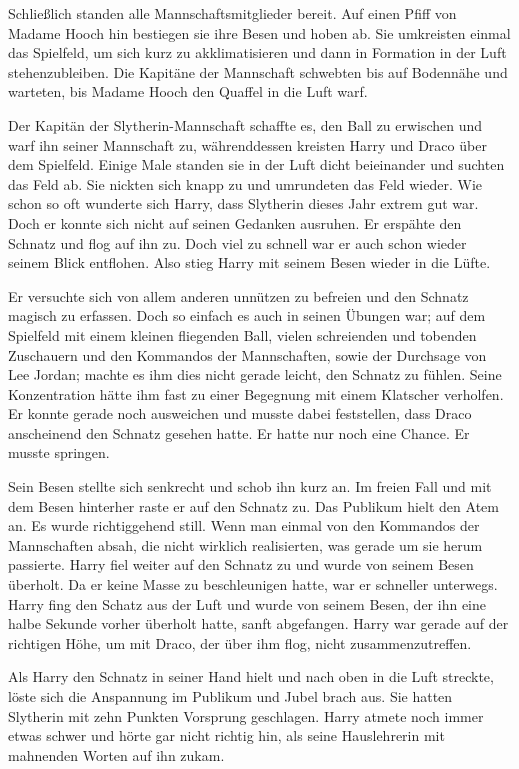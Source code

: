 Schließlich standen alle Mannschaftsmitglieder bereit. Auf einen Pfiff von Madame Hooch hin bestiegen sie ihre Besen und hoben ab. Sie umkreisten einmal das Spielfeld, um sich kurz zu akklimatisieren und dann in Formation in der Luft stehenzubleiben. Die Kapitäne der Mannschaft schwebten bis auf Bodennähe und warteten, bis Madame Hooch den Quaffel in die Luft warf.

Der Kapitän der Slytherin-Mannschaft schaffte es, den Ball zu erwischen und warf ihn seiner Mannschaft zu, währenddessen kreisten Harry und Draco über dem Spielfeld. Einige Male standen sie in der Luft dicht beieinander und suchten das Feld ab. Sie nickten sich knapp zu und umrundeten das Feld wieder. Wie schon so oft wunderte sich Harry, dass Slytherin dieses Jahr extrem gut war. Doch er konnte sich nicht auf seinen Gedanken ausruhen. Er erspähte den Schnatz und flog auf ihn zu. Doch viel zu schnell war er auch schon wieder seinem Blick entflohen. Also stieg Harry mit seinem Besen wieder in die Lüfte.

Er versuchte sich von allem anderen unnützen zu befreien und den Schnatz magisch zu erfassen. Doch so einfach es auch in seinen Übungen war; auf dem Spielfeld mit einem kleinen fliegenden Ball, vielen schreienden und tobenden Zuschauern und den Kommandos der Mannschaften, sowie der Durchsage von Lee Jordan; machte es ihm dies nicht gerade leicht, den Schnatz zu fühlen. Seine Konzentration hätte ihm fast zu einer Begegnung mit einem Klatscher verholfen. Er konnte gerade noch ausweichen und musste dabei feststellen, dass Draco anscheinend den Schnatz gesehen hatte. Er hatte nur noch eine Chance. Er musste springen.

Sein Besen stellte sich senkrecht und schob ihn kurz an. Im freien Fall und mit dem Besen hinterher raste er auf den Schnatz zu. Das Publikum hielt den Atem an. Es wurde richtiggehend still. Wenn man einmal von den Kommandos der Mannschaften absah, die nicht wirklich realisierten, was gerade um sie herum passierte. Harry fiel weiter auf den Schnatz zu und wurde von seinem Besen überholt. Da er keine Masse zu beschleunigen hatte, war er schneller unterwegs. Harry fing den Schatz aus der Luft und wurde von seinem Besen, der ihn eine halbe Sekunde vorher überholt hatte, sanft abgefangen. Harry war gerade auf der richtigen Höhe, um mit Draco, der über ihm flog, nicht zusammenzutreffen.

Als Harry den Schnatz in seiner Hand hielt und nach oben in die Luft streckte, löste sich die Anspannung im Publikum und Jubel brach aus. Sie hatten Slytherin mit zehn Punkten Vorsprung geschlagen. Harry atmete noch immer etwas schwer und hörte gar nicht richtig hin, als seine Hauslehrerin mit mahnenden Worten auf ihn zukam.

